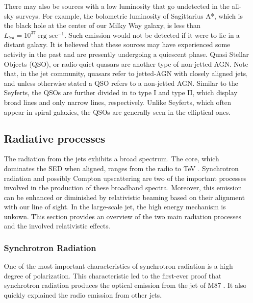 There may also be sources with a low luminosity that go undetected in the all-sky surveys. For example, the bolometric luminosity of Sagittarius A*, which is the black hole at the center of our Milky Way galaxy, is less than $L_{bol}=10^{37}~\text{erg sec}^{-1}$. Such emission would not be detected if it were to lie in a distant galaxy. It is believed that these sources may have experienced some activity in the past and are presently undergoing a quiescent phase. Quasi Stellar Objects (QSO), or radio-quiet quasars are another type of non-jetted AGN. Note that, in the jet community, quasars refer to jetted-AGN with closely aligned jets, and unless otherwise stated a QSO refers to a non-jetted AGN. Similar to the Seyferts, the QSOs are further divided in to type I and type II, which display broad lines and only narrow lines, respectively. Unlike Seyferts, which often appear in spiral galaxies, the QSOs are generally seen in the elliptical ones.

\subsection{Radiative processes \label{sec:radative_processes}}
The radiation from the jets exhibits a broad spectrum. The core, which dominates the SED when aligned, ranges from the radio to TeV \citep{harris2006x}. Synchrotron radiation and possibly Compton upscattering are two of the important processes involved in the production of these broadband spectra. Moreover, this emission can be enhanced or diminished by relativistic beaming based on their alignment with our line of sight. In the large-scale jet, the high energy mechanism is unkown. This section provides an overview of the two main radiation processes and the involved relativistic effects.


\subsubsection{Synchrotron Radiation}
One of the most important characteristics of synchrotron radiation is a high degree of polarization.  This characteristic led to the first-ever proof that synchrotron radiation produces the optical emission from the jet of M87 \citep{baade1956polarization}. It also quickly explained the radio emission from other jets.

